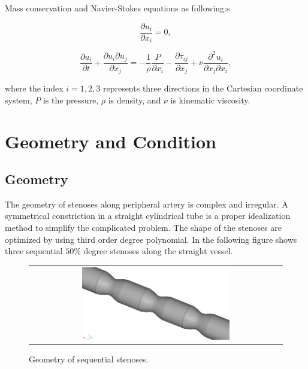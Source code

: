 Mass conservation and Navier-Stokes equations as following:s

\begin{equation}
\frac{\partial u_{i}}{\partial x_{i}} = 0,
\end{equation}

\begin{equation}
\frac{\partial u_{i}}{\partial t} + \frac{\partial u_{i} \partial u_{j}}{\partial x_{j}} = -\frac{1}{\rho} \frac{P}{\partial x_{i}} - \frac{\partial \tau_{ij}}{\partial x_{j}} + \nu \frac{\partial^{2} u_{i}}{\partial x_{j} \partial x_{i}},
\end{equation}

where the index $ i = 1, 2, 3 $ represents three directions in the Cartesian coordinate system, $ P $ is the pressure, $ \rho $ is density, and $ \nu $ is kinematic viscosity.

\section{Geometry and Condition}

\subsection{Geometry}

The geometry of stenoses along peripheral artery is complex and irregular. A symmetrical constriction in a straight cylindrical tube is a proper idealization method to simplify the complicated problem\cite{Long}. The shape of the stenoses are optimized by using third order degree polynomial. In the following figure shows three sequential $ 50\% $ degree stenoses along the straight vessel.

\begin{figure}[H]
	\centering
	\begin{tabular}{c}
		\includegraphics[width=0.6\textwidth]{./pics/geom.png}
	\end{tabular}
	\caption{\footnotesize Geometry of sequential stenoses.}
\end{figure}

